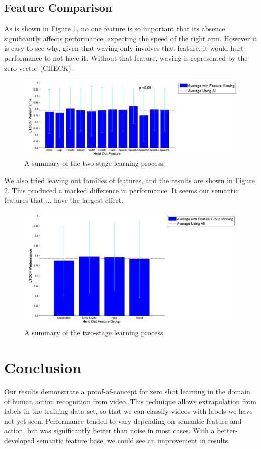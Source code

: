 \documentclass{article}
\begin{document}
\subsection{Feature Comparison}

As is shown in Figure \ref{featplot}, no one feature is so important that its absence significantly affects performance, expecting the speed of the right arm.  However it is easy to see why, given that waving only involves that feature, it would hurt performance to not have it. Without that feature, waving is represented by the zero vector (CHECK).

\begin{figure}[h]
  \centering
  \includegraphics[width=\linewidth]{feature_snap}
  \caption{A summary of the two-stage learning process.}
  \label{featplot}
\end{figure}

We also tried leaving out families of features, and the results are shown in Figure \ref{featgplot}.  This produced a marked difference in performance. It seems our semantic features that ... have the largest effect.

\begin{figure}[h]
  \centering
  \includegraphics[width=\linewidth]{featuregrp_snap}
  \caption{A summary of the two-stage learning process.}
  \label{featgplot}
\end{figure}

\section{Conclusion}
Our results demonstrate a proof-of-concept for zero shot learning in the domain of human action recognition from video. This technique allows extrapolation from labels in the training data set, so that we can classify videos with labels we have not yet seen.  Performance tended to vary depending on semantic feature and action, but was significantly better than noise in most cases. With a better-developed semantic feature base, we could see an improvement in results.



\end{document}
